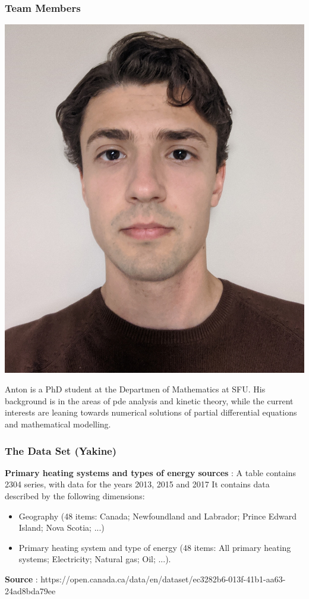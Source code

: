 \documentclass{beamer}
\begin{document}
\begin{frame}
\frametitle{Team Members}

\vspace{10pt}
\begin{minipage}[b]{0.15\textwidth}
\includegraphics[width=\textwidth, trim={70pt 170pt 70pt 100pt}, clip]{TeamPics/Ryan.jpg}
\end{minipage}\hspace{0.05\textwidth}%
\begin{minipage}[b]{0.8\textwidth}
{\small Anton is a PhD student at the Departmen of Mathematics at SFU. His background is in the areas of pde analysis and kinetic theory, while the current interests are leaning towards numerical solutions of partial differential equations and mathematical modelling. }
\end{minipage}


\end{frame}





\begin{frame}
\frametitle{The Data Set (Yakine)}
\textbf{Primary heating systems and types of energy sources} : A table contains 2304 series, with data for the years 2013, 2015 and 2017
It contains data described by the following dimensions:
\begin{itemize}
\item Geography (48 items: Canada; Newfoundland and Labrador; Prince Edward Island; Nova Scotia; ...)
\item Primary heating system and type of energy (48 items: All primary heating systems; Electricity; Natural gas; Oil; ...).
\end{itemize}
\textbf{Source} : https://open.canada.ca/data/en/dataset/ec3282b6-013f-41b1-aa63-24ad8bda79ee
\end{frame}
\end{document}
